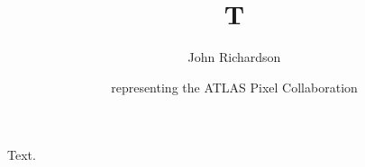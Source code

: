 \documentclass[aps]{revtex4-2}
\begin{document}
\title{T}
\author{John Richardson}
\author{representing the ATLAS Pixel Collaboration}
\maketitle
Text.
\end{document}

